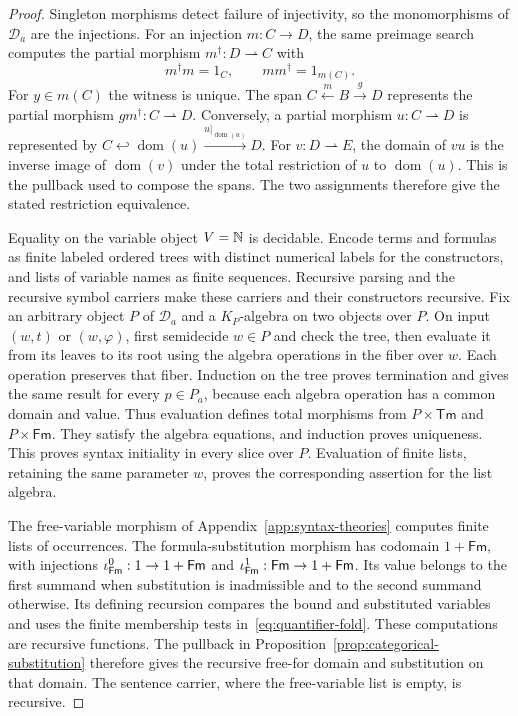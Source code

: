 \begin{proof}
Singleton morphisms detect failure of injectivity, so the monomorphisms
of $\mathcal D_a$ are the injections. For an injection $m:C\to D$,
the same preimage search computes the partial morphism
$m^\dagger:D\rightharpoonup C$ with
\[
 m^\dagger m=1_C,\qquad mm^\dagger=1_{m(C)}.
\]
For $y\in m(C)$ the witness is unique. The span
$C\xleftarrow{m}B\xrightarrow{g}D$ represents the partial morphism
$gm^\dagger:C\rightharpoonup D$. Conversely, a partial morphism
$u:C\rightharpoonup D$ is represented by
$C\hookleftarrow\operatorname{dom}(u)
\xrightarrow{u|_{\operatorname{dom}(u)}}D$.
For $v:D\rightharpoonup E$, the domain of $vu$ is the inverse image of $\operatorname{dom}(v)$
under the total restriction of $u$ to $\operatorname{dom}(u)$.
This is the pullback used to compose the spans. The two assignments
therefore give the stated restriction equivalence.

Equality on the variable object $V=\mathbb N$ is decidable. Encode terms and formulas
as finite labeled ordered trees with distinct numerical labels for
the constructors, and lists of variable names as finite sequences. Recursive parsing
and the recursive symbol carriers make these carriers and their
constructors recursive. Fix an arbitrary object $P$ of $\mathcal D_a$
and a $K_P$-algebra on two objects over $P$. On input $(w,t)$ or
$(w,\varphi)$, first semidecide $w\in P$ and check the tree, then
evaluate it from its leaves to its root using the algebra operations
in the fiber over $w$. Each operation preserves that fiber.
Induction on the tree proves termination and gives the same result
for every $p\in P_a$, because each algebra operation has a common
domain and value. Thus evaluation defines total morphisms from
$P\times\mathsf{Tm}$ and $P\times\mathsf{Fm}$. They satisfy the algebra
equations, and induction
proves uniqueness. This proves syntax initiality in every slice
over $P$. Evaluation of finite lists, retaining the same parameter
$w$, proves the corresponding assertion for the list algebra.

The free-variable morphism of Appendix~\ref{app:syntax-theories}
computes finite lists of occurrences. The formula-substitution morphism
has codomain $1+\mathsf{Fm}$, with injections
$\iota^{0}_{\mathsf{Fm}}:1\to1+\mathsf{Fm}$ and
$\iota^{1}_{\mathsf{Fm}}:\mathsf{Fm}\to1+\mathsf{Fm}$.
Its value belongs to the first summand when substitution is inadmissible
and to the second summand otherwise. Its defining recursion
compares the bound and substituted variables and uses the finite
membership tests in~\eqref{eq:quantifier-fold}. These computations
are recursive functions. The pullback in
Proposition~\ref{prop:categorical-substitution} therefore gives the
recursive free-for domain and substitution on that domain. The
sentence carrier, where the free-variable list is empty, is recursive.


\end{proof}
